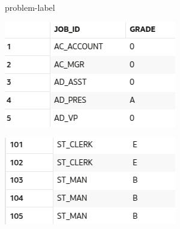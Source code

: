 \begin{problem}{}{problem-label}
\vspace{1em}

\begin{center}
  \includegraphics[scale=0.8]{images/c4a5-1.png}
\end{center}
\begin{center}
    \includegraphics[scale=0.8]{images/c4a5-2.png}
\end{center}

\end{problem}

